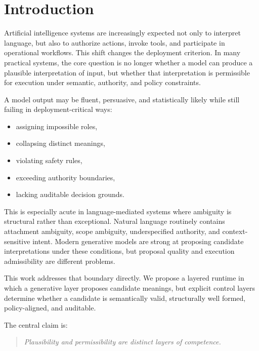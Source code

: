 \documentclass[11pt,a4paper]{article}
\begin{document}
\section{Introduction}

Artificial intelligence systems are increasingly expected not only to interpret language, but also to authorize actions, invoke tools, and participate in operational workflows. This shift changes the deployment criterion. In many practical systems, the core question is no longer whether a model can produce a plausible interpretation of input, but whether that interpretation is permissible for execution under semantic, authority, and policy constraints.

A model output may be fluent, persuasive, and statistically likely while still failing in deployment-critical ways:
\begin{itemize}[leftmargin=*, itemsep=2pt]
  \item assigning impossible roles,
  \item collapsing distinct meanings,
  \item violating safety rules,
  \item exceeding authority boundaries,
  \item lacking auditable decision grounds.
\end{itemize}

This is especially acute in language-mediated systems where ambiguity is structural rather than exceptional. Natural language routinely contains attachment ambiguity, scope ambiguity, underspecified authority, and context-sensitive intent. Modern generative models are strong at proposing candidate interpretations under these conditions, but proposal quality and execution admissibility are different problems.

This work addresses that boundary directly. We propose a layered runtime in which a generative layer proposes candidate meanings, but explicit control layers determine whether a candidate is semantically valid, structurally well formed, policy-aligned, and auditable.

The central claim is:

\begin{quote}
\emph{Plausibility and permissibility are distinct layers of competence.}
\end{quote}
\end{document}
